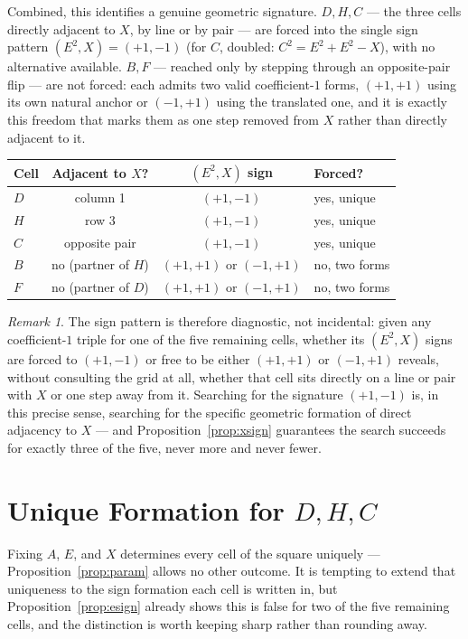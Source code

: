 \documentclass[12pt]{article}
\theoremstyle{remark}
\newtheorem{remark}[theorem]{Remark}
\begin{document}
Combined, this identifies a genuine geometric signature. $D,H,C$ ---
the three cells directly adjacent to $X$, by line or by pair --- are
forced into the single sign pattern $(E^2,X)=(+1,-1)$ (for $C$,
doubled: $C^2=E^2+E^2-X$), with no alternative available. $B,F$ ---
reached only by stepping through an opposite-pair flip --- are not
forced: each admits two valid coefficient-$1$ forms, $(+1,+1)$ using
its own natural anchor or $(-1,+1)$ using the translated one, and it
is exactly this freedom that marks them as one step removed from $X$
rather than directly adjacent to it.

\begin{center}
\begin{tabular}{lccl}
\hline
Cell & Adjacent to $X$? & $(E^2,X)$ sign & Forced? \\
\hline
$D$ & column 1 & $(+1,-1)$ & yes, unique \\
$H$ & row 3 & $(+1,-1)$ & yes, unique \\
$C$ & opposite pair & $(+1,-1)$ & yes, unique \\
$B$ & no (partner of $H$) & $(+1,+1)$ or $(-1,+1)$ & no, two forms \\
$F$ & no (partner of $D$) & $(+1,+1)$ or $(-1,+1)$ & no, two forms \\
\hline
\end{tabular}
\end{center}

\begin{remark}
The sign pattern is therefore diagnostic, not incidental: given any
coefficient-$1$ triple for one of the five remaining cells, whether
its $(E^2,X)$ signs are forced to $(+1,-1)$ or free to be either
$(+1,+1)$ or $(-1,+1)$ reveals, without consulting the grid at all,
whether that cell sits directly on a line or pair with $X$ or one step
away from it. Searching for the signature $(+1,-1)$ is, in this
precise sense, searching for the specific geometric formation of
direct adjacency to $X$ --- and Proposition~\ref{prop:xsign} guarantees
the search succeeds for exactly three of the five, never more and
never fewer.
\end{remark}

\section{Unique Formation for $D, H, C$}\label{sec:formationnote}

Fixing $A$, $E$, and $X$ determines every cell of the square uniquely
--- Proposition~\ref{prop:param} allows no other outcome. It is
tempting to extend that uniqueness to the sign formation each cell is
written in, but Proposition~\ref{prop:esign} already shows this is
false for two of the five remaining cells, and the distinction is
worth keeping sharp rather than rounding away.
\end{document}
